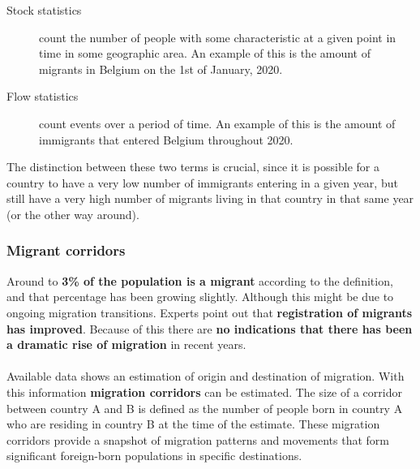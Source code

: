 \documentclass[../summary.tex]{subfiles}
\begin{document}
	\begin{description}
		\item[Stock statistics] count the number of people with some characteristic at a given point in time in some geographic area. An example of this is the amount of migrants in Belgium on the 1st of January, 2020.
		\item[Flow statistics] count events over a period of time. An example of this is the amount of immigrants that entered Belgium throughout 2020.
	\end{description}
	The distinction between these two terms is crucial, since it is possible for a country to have a very low number of immigrants entering in a given year, but still have a very high number of migrants living in that country in that same year (or the other way around). 
	
	\subsubsection{Migrant corridors}
	Around to \textbf{3\% of the population is a migrant} according to the definition, and that percentage has been growing slightly. Although this might be due to ongoing migration transitions. Experts point out that \textbf{registration of migrants has improved}. Because of this there are \textbf{no indications that there has been a dramatic rise of migration} in recent years.
	\\\\
	Available data shows an estimation of origin and destination of migration. With this information \textbf{migration corridors} can be estimated. The size of a corridor between country A and B is defined as the number of people born in country A who are residing in country B at the time of the estimate. These migration corridors provide a snapshot of migration patterns and movements that form significant foreign-born populations in specific destinations.
	
\end{document}
